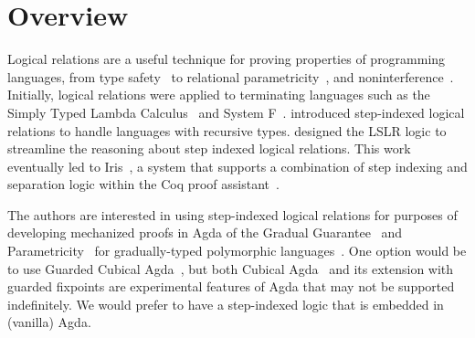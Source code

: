 \documentclass[acmsmall]{acmart}
\begin{document}




\maketitle


\clearpage

\tableofcontents

\section{Overview}
\label{sec:intro}

Logical relations are a useful technique for proving properties of
programming languages, from type safety~\citep{Timany:2022aa} to
relational parametricity~\citep{REYNOLDS83}, and
noninterference~\citep{heintze1998slam}.  Initially, logical relations
were applied to terminating languages such as the Simply Typed Lambda
Calculus~\citep{Tait:1967aa} and System F~\citep{GIRARD72}.
\citet{Appel:2001aa} introduced step-indexed logical relations to
handle languages with recursive types.  \citet{Dreyer:2011wl} designed
the LSLR logic to streamline the reasoning about step indexed logical
relations.  This work eventually led to Iris~\citep{JUNG:2018aa}, a
system that supports a combination of step indexing and separation
logic within the Coq proof
assistant~\citep{The-Coq-Development-Team:2004kf,Huet:2016aa}.

The authors are interested in using step-indexed logical relations for
purposes of developing mechanized proofs in Agda of the Gradual
Guarantee~\citep{Siek:2015ac} and Parametricity~\citep{REYNOLDS74C}
for gradually-typed polymorphic
languages~\citep{Ahmed:2011fk,Ahmed:2017aa,Igarashi:2017aa,New:2019ab,Labrada:2020tk}. One
option would be to use Guarded Cubical Agda~\citep{Veltri:2020aa}, but
both Cubical Agda~\citep{Vezzosi:2019aa} and its extension with
guarded fixpoints are experimental features of Agda that may not be
supported indefinitely.  We would prefer to have a step-indexed logic
that is embedded in (vanilla) Agda.
\end{document}
